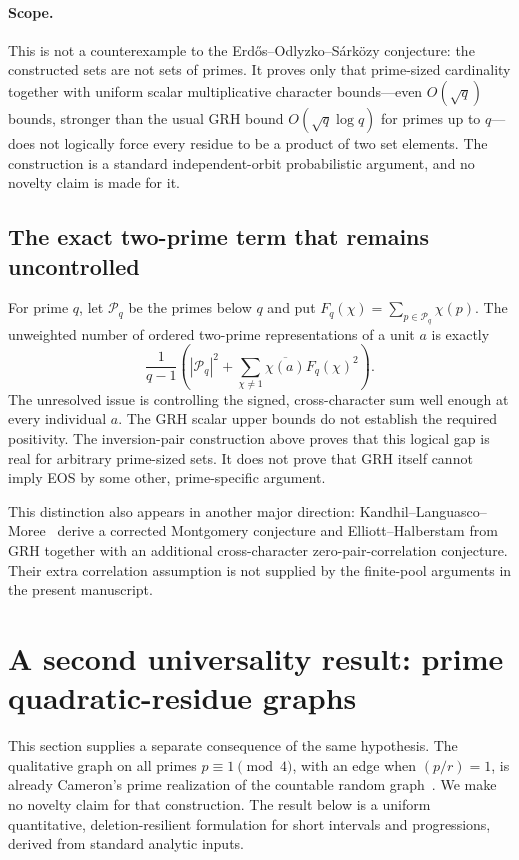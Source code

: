 \documentclass[11pt,a4paper]{article}
\theoremstyle{definition}
\theoremstyle{remark}
\begin{document}
\paragraph{Scope.}
This is not a counterexample to the Erd\H{o}s--Odlyzko--S\'ark\"ozy
conjecture: the constructed sets are not sets of primes.  It proves only
that prime-sized cardinality together with uniform scalar multiplicative
character bounds---even $O(\sqrt q)$ bounds, stronger than the usual
GRH bound $O(\sqrt q\log q)$ for primes up to $q$---does not logically
force every residue to be a product of two set elements.  The construction
is a standard independent-orbit probabilistic argument, and no novelty
claim is made for it.





\subsection{The exact two-prime term that remains uncontrolled}

For prime $q$, let $\mathcal P_q$ be the primes below $q$ and put
$F_q(\chi)=\sum_{p\in\mathcal P_q}\chi(p)$. The unweighted number
of ordered two-prime representations of a unit $a$ is exactly
\[
 \frac1{q-1}\left(
 |\mathcal P_q|^2+
 \sum_{\chi\ne1}\overline{\chi(a)}F_q(\chi)^2\right).
\]
The unresolved issue is controlling the signed, cross-character sum
well enough at every individual $a$. The GRH scalar upper bounds do
not establish the required positivity. The inversion-pair construction
above proves that this logical gap is real for arbitrary prime-sized
sets. It does not prove that GRH itself cannot imply EOS by some other,
prime-specific argument.

This distinction also appears in another major direction:
Kandhil--Languasco--Moree~\cite{p-KLM2026} derive a corrected Montgomery
conjecture and Elliott--Halberstam from GRH together with an additional
cross-character zero-pair-correlation conjecture. Their extra
correlation assumption is not supplied by the finite-pool arguments
in the present manuscript.



\section{A second universality result: prime quadratic-residue graphs}\label{p-sec:prime-graphs}
This section supplies a separate consequence of the same hypothesis.
The qualitative graph on all primes $p\equiv1\pmod4$, with an edge when
$(p/r)=1$, is already Cameron's prime realization of the countable random
graph~\cite{p-Cameron}. We make no novelty claim for that construction.
The result below is a uniform quantitative, deletion-resilient
formulation for short intervals and progressions, derived from standard
analytic inputs.
\end{document}
